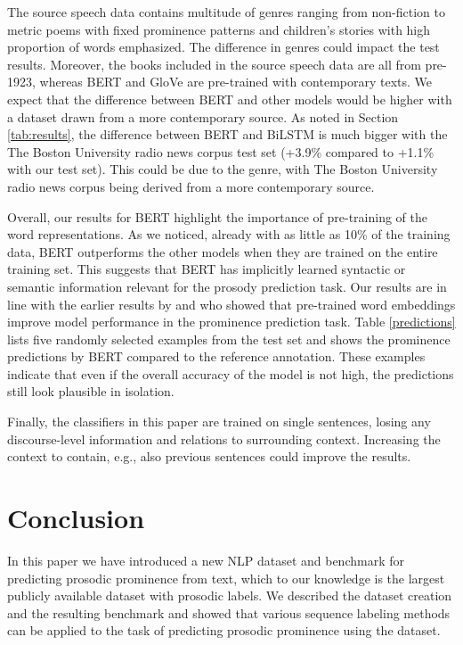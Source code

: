 \documentclass[11pt]{article}
\begin{document}
The source speech data contains multitude of genres ranging from non-fiction to metric poems with fixed prominence patterns and children's stories with high proportion of words emphasized. The difference in genres could impact the test results. Moreover, the books included in the source speech data are all from pre-1923, whereas BERT and GloVe are pre-trained with contemporary texts. We expect that the difference between BERT and other models would be higher with a dataset drawn from a more contemporary source. As noted in Section \ref{tab:results}, the difference between BERT and BiLSTM is much bigger with the The Boston University radio news corpus test set (+3.9\% compared to +1.1\% with our test set). This could be due to the genre, with The Boston University radio news corpus being derived from a more contemporary source.

Overall, our results for BERT highlight the importance of pre-training of the word representations. As we noticed, already with as little as 10\% of the training data, BERT outperforms the other models when they are trained on the entire training set. This suggests that BERT has implicitly learned syntactic or semantic information relevant for the prosody prediction task. Our results are in line with the earlier results by \citet{stehwien2018embeddings} and \citet{rendel2016using} who showed that pre-trained word embeddings improve model performance in the prominence prediction task. Table \ref{predictions} lists five randomly selected examples from the test set and shows the prominence predictions by BERT compared to the reference annotation. These examples indicate that even if the overall accuracy of the model is not high, the predictions still look plausible in isolation.

Finally, the classifiers in this paper are trained on single sentences, losing any discourse-level information and relations to surrounding context. Increasing the context to contain, e.g., also previous sentences could improve the results.

\section{Conclusion}
In this paper we have introduced a new NLP dataset and benchmark for predicting prosodic prominence from text, which to our knowledge is the largest publicly available dataset with prosodic labels. We described the dataset creation and the resulting benchmark and showed that various sequence labeling methods can be applied to the task of predicting prosodic prominence using the dataset.
\end{document}
